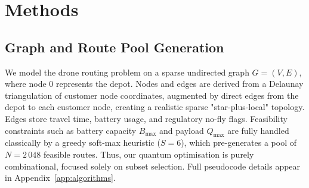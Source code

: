 



\usepackage{bbm}

\section{Methods}\label{sec:methods}

\subsection{Graph and Route Pool Generation}\label{sec:graph}

We model the drone routing problem on a sparse undirected graph \(G=(V,E)\), where node \(0\) represents the depot. Nodes and edges are derived from a Delaunay triangulation of customer node coordinates, augmented by direct edges from the depot to each customer node, creating a realistic sparse "star-plus-local" topology. Edges store travel time, battery usage, and regulatory no-fly flags. Feasibility constraints such as battery capacity \(B_{\max}\) and payload \(Q_{\max}\) are fully handled classically by a greedy soft-max heuristic (\(S=6\)), which pre-generates a pool of \(N=2\,048\) feasible routes. Thus, our quantum optimisation is purely combinational, focused solely on subset selection. Full pseudocode details appear in Appendix~\ref{app:algorithms}.

